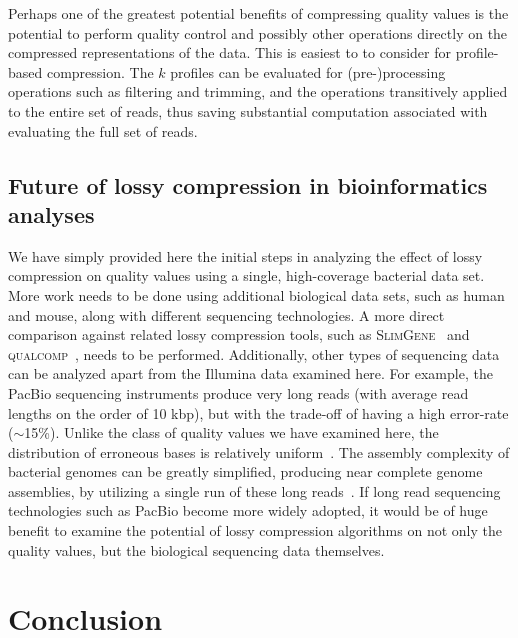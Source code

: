 Perhaps one of the greatest potential benefits of compressing quality
values is the potential to perform quality control and possibly other
operations directly on the compressed representations of the
data. This is easiest to to consider for profile-based
compression. The $k$ profiles can be evaluated for (pre-)processing
operations such as filtering and trimming, and the operations
transitively applied to the entire set of reads, thus saving
substantial computation associated with evaluating the full set of
reads.

\subsection{Future of lossy compression in bioinformatics analyses}

We have simply provided here the initial steps in analyzing the effect
of lossy compression on quality values using a single,
high-coverage bacterial data set. More work needs to be done using
additional biological data sets, such as human and mouse, along with
different sequencing technologies. A more direct comparison against
related lossy compression tools, such as
\textsc{SlimGene}~\cite{Kozanitis:2011kl} and
\textsc{\textsc{q}ual\textsc{c}omp}~\cite{Ochoa:2013rt}, needs to be
performed. Additionally, other types of sequencing data can be
analyzed apart from the Illumina data examined here. For example, the
PacBio sequencing instruments produce very long reads (with average
read lengths on the order of 10 kbp), but with the trade-off of having
a high error-rate ($\sim$15\%). Unlike the class of quality values we
have examined here, the distribution of erroneous bases is relatively
uniform~\cite{Ferrarini:2013vf}. The assembly complexity of bacterial
genomes can be greatly simplified, producing near complete genome
assemblies, by utilizing a single run of these long
reads~\cite{Koren:2013ye}. If long read sequencing technologies such
as PacBio become more widely adopted, it would be of huge benefit to
examine the potential of lossy compression algorithms on not only the
quality values, but the biological sequencing data themselves.


%
%

\section{Conclusion}

